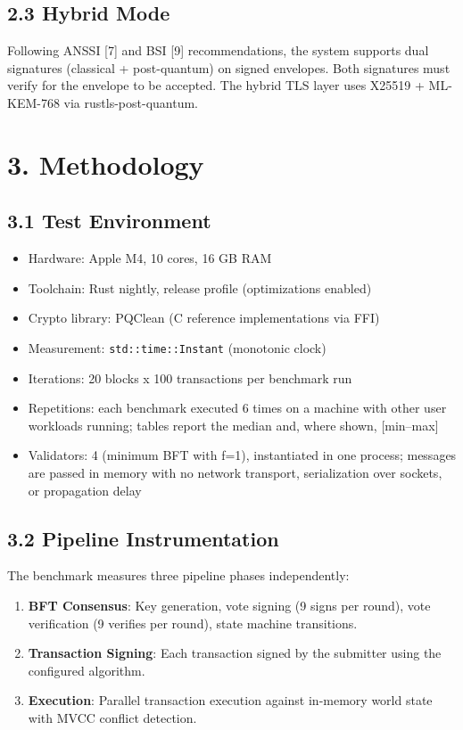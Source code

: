 \documentclass[
]{article}
\providecommand{\tightlist}{%
  \setlength{\itemsep}{0pt}\setlength{\parskip}{0pt}}
\begin{document}
\subsection{2.3 Hybrid Mode}\label{hybrid-mode}

Following ANSSI {[}7{]} and BSI {[}9{]} recommendations, the system
supports dual signatures (classical + post-quantum) on signed envelopes.
Both signatures must verify for the envelope to be accepted. The hybrid
TLS layer uses X25519 + ML-KEM-768 via rustls-post-quantum.

\section{3. Methodology}\label{methodology}

\subsection{3.1 Test Environment}\label{test-environment}

\begin{itemize}
\tightlist
\item
  Hardware: Apple M4, 10 cores, 16 GB RAM
\item
  Toolchain: Rust nightly, release profile (optimizations enabled)
\item
  Crypto library: PQClean (C reference implementations via FFI)
\item
  Measurement: \texttt{std::time::Instant} (monotonic clock)
\item
  Iterations: 20 blocks x 100 transactions per benchmark run
\item
  Repetitions: each benchmark executed 6 times on a machine with other
  user workloads running; tables report the median and, where shown,
  {[}min--max{]}
\item
  Validators: 4 (minimum BFT with f=1), instantiated in one process;
  messages are passed in memory with no network transport, serialization
  over sockets, or propagation delay
\end{itemize}

\subsection{3.2 Pipeline
Instrumentation}\label{pipeline-instrumentation}

The benchmark measures three pipeline phases independently:

\begin{enumerate}
\def\labelenumi{\arabic{enumi}.}
\tightlist
\item
  \textbf{BFT Consensus}: Key generation, vote signing (9 signs per
  round), vote verification (9 verifies per round), state machine
  transitions.
\item
  \textbf{Transaction Signing}: Each transaction signed by the submitter
  using the configured algorithm.
\item
  \textbf{Execution}: Parallel transaction execution against in-memory
  world state with MVCC conflict detection.
\end{enumerate}
\end{document}
